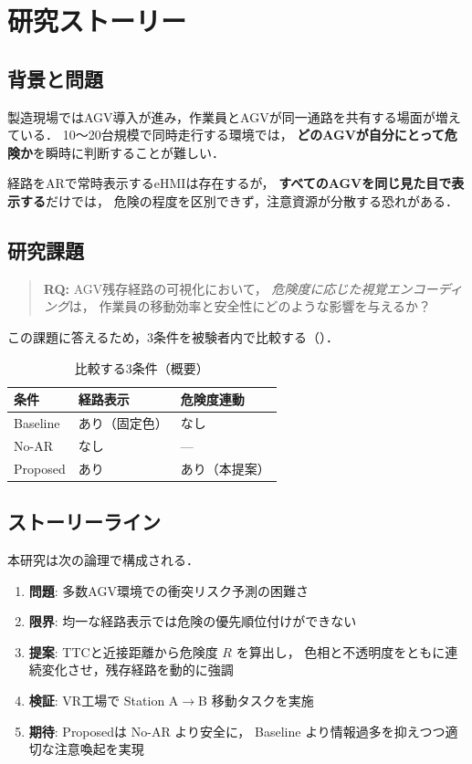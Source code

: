 \section{研究ストーリー}
\label{sec:story}

\subsection{背景と問題}

製造現場ではAGV導入が進み，作業員とAGVが同一通路を共有する場面が増えている．
10〜20台規模で同時走行する環境では，
\textbf{どのAGVが自分にとって危険か}を瞬時に判断することが難しい．

経路をARで常時表示するeHMIは存在するが，
\textbf{すべてのAGVを同じ見た目で表示する}だけでは，
危険の程度を区別できず，注意資源が分散する恐れがある．

\subsection{研究課題}

\begin{quote}
  \textbf{RQ:}
  AGV残存経路の可視化において，
  \emph{危険度に応じた視覚エンコーディング}は，
  作業員の移動効率と安全性にどのような影響を与えるか？
\end{quote}

この課題に答えるため，3条件を被験者内で比較する（）．

\begin{table}[htbp]
  \centering
  \caption{比較する3条件（概要）}
  \label{tab:conditions_preview}
  \begin{tabular}{lll}
    \toprule
    条件 & 経路表示 & 危険度連動 \\
    \midrule
    Baseline & あり（固定色） & なし \\
    No-AR    & なし           & --- \\
    Proposed & あり           & あり（本提案） \\
    \bottomrule
  \end{tabular}
\end{table}

\subsection{ストーリーライン}

本研究は次の論理で構成される．

\begin{enumerate}[leftmargin=2em]
  \item \textbf{問題}: 多数AGV環境での衝突リスク予測の困難さ
  \item \textbf{限界}: 均一な経路表示では危険の優先順位付けができない
  \item \textbf{提案}: TTCと近接距離から危険度 $R$ を算出し，
        色相と不透明度をともに連続変化させ，残存経路を動的に強調
  \item \textbf{検証}: VR工場で Station A$\rightarrow$B 移動タスクを実施
  \item \textbf{期待}: Proposedは No-AR より安全に，
        Baseline より情報過多を抑えつつ適切な注意喚起を実現
\end{enumerate}

